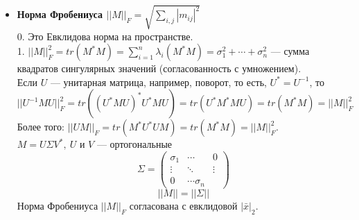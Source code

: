 \documentclass[12pt]{article}
\begin{document}
\begin{itemize}
		\item \textbf{Норма Фробениуса $||M||_F=\sqrt{\sum\limits_{i,j}|m_{ij}|^2}$}\\
		0. Это Евклидова норма на пространстве.\\
		1. $||M||_F^2=tr(M^*M)=\sum\limits_{i=1}^n\lambda_i(M^*M)=\sigma_1^2+\cdots+\sigma_n^2$ --- сумма квадратов сингулярных значений (согласованность с умножением).\\
		Если $U$ --- унитарная матрица, например, поворот, то есть, $U^*=U^{-1}$, то $$||U^{-1}MU||_F^2=tr((U^*MU)^*U^*MU)=tr(U^*M^*MU)=tr(M^*M)=||M||_F^2$$
		Более того: $||UM||_F=tr(M^*U^*UM)=tr(M^*M)=||M||_F^2$.\\
		$M=U\Sigma V^*,~U$ и $V$ --- ортогональные\\
		\[\Sigma = \begin{pmatrix}
		\sigma_1 & \cdots & 0\\
		\vdots & \ddots & \vdots\\
		0 & \cdots \sigma_n
		\end{pmatrix}\]
		$$||M||=||\Sigma||$$
		Норма Фробениуса $||M||_F$ согласована с евклидовой $|\bar x|_2$.
	\end{itemize}
\end{document}
